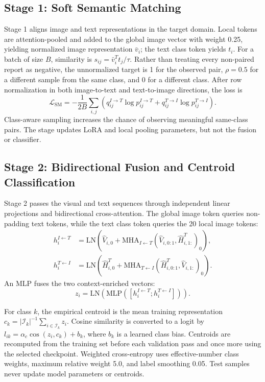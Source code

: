 \documentclass[runningheads]{llncs}
\begin{document}
\subsection{Stage 1: Soft Semantic Matching}

Stage 1 aligns image and text representations in the target domain. Local tokens are attention-pooled and added to the global image vector with weight 0.25, yielding normalized image representation $\bar v_i$; the text class token yields $t_i$. For a batch of size $B$, similarity is $s_{ij}=\bar v_i^Tt_j/\tau$. Rather than treating every non-paired report as negative, the unnormalized target is 1 for the observed pair, $\rho=0.5$ for a different sample from the same class, and 0 for a different class. After row normalization in both image-to-text and text-to-image directions, the loss is
\begin{equation}
\mathcal{L}_{\mathrm{SM}}=-\frac{1}{2B}\sum_{i,j}
\left(q^{I\rightarrow T}_{ij}\log p^{I\rightarrow T}_{ij}
+q^{T\rightarrow I}_{ij}\log p^{T\rightarrow I}_{ij}\right).
\end{equation}
Class-aware sampling increases the chance of observing meaningful same-class pairs. The stage updates LoRA and local pooling parameters, but not the fusion or classifier.

\subsection{Stage 2: Bidirectional Fusion and Centroid Classification}

Stage 2 passes the visual and text sequences through independent linear projections and bidirectional cross-attention. The global image token queries non-padding text tokens, while the text class token queries the 20 local image tokens:
\begin{align}
h_i^{I\leftarrow T}&=\mathrm{LN}\left(\hat V_{i,0}+\mathrm{MHA}_{I\leftarrow T}(\hat V_{i,0:1},\hat H^T_{i,1:})_0\right),\\
h_i^{T\leftarrow I}&=\mathrm{LN}\left(\hat H^T_{i,0}+\mathrm{MHA}_{T\leftarrow I}(\hat H^T_{i,0:1},\hat V_{i,1:})_0\right).
\end{align}
An MLP fuses the two context-enriched vectors:
\begin{equation}
z_i=\mathrm{LN}\left(\mathrm{MLP}\left([h_i^{I\leftarrow T};h_i^{T\leftarrow I}]\right)\right).
\end{equation}

For class $k$, the empirical centroid is the mean training representation $c_k=|\mathcal{I}_k|^{-1}\sum_{i\in\mathcal{I}_k}z_i$. Cosine similarity is converted to a logit by $l_{ik}=\alpha_c\cos(z_i,c_k)+b_k$, where $b_k$ is a learned class bias. Centroids are recomputed from the training set before each validation pass and once more using the selected checkpoint. Weighted cross-entropy uses effective-number class weights, maximum relative weight 5.0, and label smoothing 0.05. Test samples never update model parameters or centroids.
\end{document}
